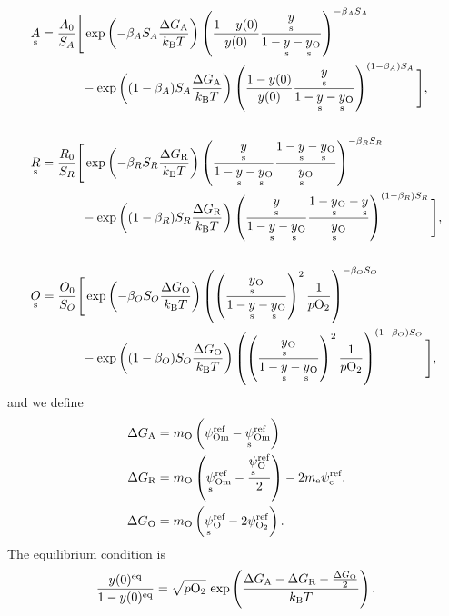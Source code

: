 \documentclass{article}
\numberwithin{equation}{section}
\newcommand{\us}[1]{\underset{\textrm{s}}{#1}{}}
\def\kB{k_\mathrm{B}}
\def\Ox{\mathrm{O}}
\newcommand{\OO}{{\ce{O2}}}
\def\ys{\us y}
\def\y0{y(0)}
\def\yOs{\us y_\textrm{O}}
\def\pO2{p\OO}
\def\A0{A_0}
\def\R0{R_0}
\def\K0{O_0}
\def\DGA{\Delta G_\textrm{A}  }
\def\DGR{\Delta G_\textrm{R}  }
\def\DGO{\Delta G_\textrm{O}  }
\def\betaA{\beta_A}
\def\betaR{\beta_R}
\def\betaO{\beta_O}
\def\SA{S_A}
\def\SR{S_R}
\def\SO{S_O}
\def\eq{\textrm{eq}}
\def\REF{\textrm{ref}}
\begin{document}
\begin{subequations}
\begin{align}
&\us A
=
\frac{\A0}{\SA}
\Bigg[
	\exp
	\left(
		{-\betaA \SA \frac{\DGA}{\kB T}}
	\right)
	\left(
		\frac{1 - \y0}{\y0}
		\frac{\ys}{1-\ys -\yOs}
	\right)^{-\betaA \SA}
\\ \nonumber
	&\quad \quad \quad \quad	
	-
	\exp
	\left(
		{(1-\betaA) \SA \frac{\DGA}{\kB T}}
	\right)
	\left(
		\frac{1 - \y0 }{\y0}
		\frac{\ys}{1-\ys-\yOs}
	\right)^{(1-\betaA) \SA}
\Bigg],
\\ \nonumber
\\
&\us R
=
\frac{\R0}{\SR}
\Bigg[
	\exp
	\left(
		{-\betaR \SR \frac{\DGR}{\kB T}}
	\right)
	\left(
		\frac{\ys}{1- \ys - \yOs}
		\frac{1 -\ys -\yOs}{\yOs}
	\right)^{-\betaR \SR}
\\ \nonumber
	& \quad \quad \quad \quad	
	-
	\exp
	\left(
		{(1 - \betaR) \SR \frac{\DGR}{\kB T}}
	\right)
	\left(
		\frac{\ys}{1- \ys - \yOs}
		\frac{1-\yOs - \ys}{\yOs}
	\right)^{(1-\betaR) \SR}
\Bigg],
\\ \nonumber
\\
&\us O
=
\frac{\K0}{\SO}
\Bigg[
	\exp
	\left(
		{-\betaO \SO \frac{\DGO}{\kB T}}
	\right)
	\left(
		\left(
			\frac{\yOs}{1-\ys-\yOs}
		\right)^2
		\frac{1}{\pO2}
	\right)^{-\betaO \SO}
\\ \nonumber
	&\quad \quad \quad \quad	
	-
	\exp
	\left(
		{(1-\betaO) \SO \frac{\DGO}{\kB T}}
	\right)
	\left(
		\left(
			\frac{\yOs}{1-\ys-\yOs}
		\right)^2
		\frac{1}{\pO2}
	\right)^{(1 - \betaO) \SO}
\Bigg],
\end{align}
\end{subequations}
and we define
\begin{subequations}
\begin{align}
\DGA
&=
m_\Ox
\left(
	\psi_{\textrm{Om}}^\REF
	-
	\us \psi_{\textrm{Om}}^\REF
\right)
\\
\DGR
&= 
m_\Ox
\left(
	\us \psi_{\textrm{Om}}^\REF
	-
	\frac{\us \psi_{\Ox}^\REF}{2}
\right)
-
2 m_\textrm{e} \psi_{\textrm{e}}^\REF.
\\
\DGO
&= 
m_\Ox
\left(
	\us \psi_{\Ox}^\REF
	-
	2 \psi_{\OO}^\REF
\right).
\end{align}
\end{subequations}
The equilibrium condition is
\begin{subequations}
\begin{align}
\frac{\y0^\eq}{1-\y0^\eq} = \sqrt{\pO2} \ \textrm{exp}
\left(
	\frac{\DGA - \DGR - \frac{\DGO}{2}}{\kB T}
\right).
\end{align}
\end{subequations}
\end{document}
